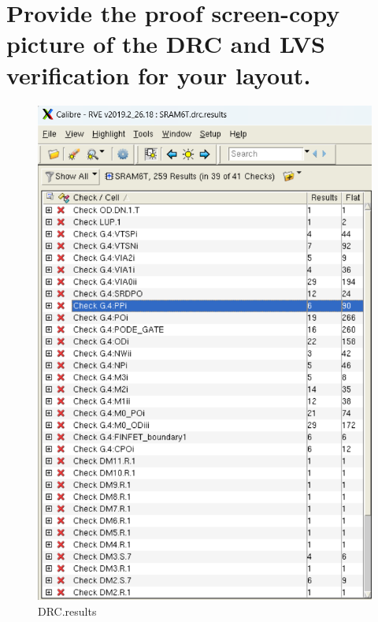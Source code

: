 \documentclass{article}
\begin{document}
\section{Provide the proof screen-copy picture of the DRC and LVS
verification for your layout.}

\begin{figure}[H]
\centering
\begin{minipage}[t]{0.45\textwidth}
\centering
    \includegraphics[width=\linewidth]{./img/2024-01-05-15-01-42.png}
\caption{DRC.results}
\label{filter}
\end{minipage}
\qquad
\begin{minipage}[t]{0.45\textwidth}
\centering

\end{minipage}
\end{figure}
\end{document}
